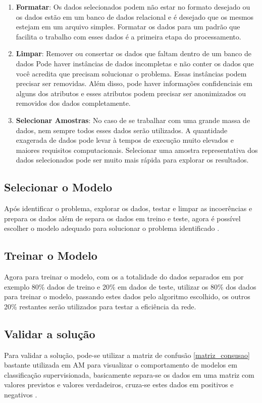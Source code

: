 \begin{enumerate}
	\item \textbf{Formatar}: Os dados selecionados podem não estar no formato desejado ou os dados estão em um banco de dados relacional e é desejado que os mesmos estejam em um arquivo simples. Formatar os dados para um padrão que facilita o trabalho com esses dados é a primeira etapa do processamento.
	\item \textbf{Limpar}: Remover ou consertar os dados que faltam dentro de um banco de dados  Pode haver instâncias de dados incompletas e não conter os dados que você acredita que precisam solucionar o problema. Essas instâncias podem precisar ser removidas. Além disso, pode haver informações confidenciais em alguns dos atributos e esses atributos podem precisar ser anonimizados ou removidos dos dados completamente.
	\item \textbf{Selecionar Amostras}: No caso de se trabalhar com uma grande massa de dados, nem sempre todos esses dados serão utilizados. A quantidade exagerada de dados pode levar à tempos de execução muito elevados e maiores requisitos computacionais. Selecionar uma amostra representativa dos dados selecionados pode ser muito mais rápida para explorar os resultados.
\end{enumerate}

\subsection{Selecionar o Modelo}
Após identificar o problema, explorar os dados, testar e limpar as incoerências e prepara os dados além de separa os dados em treino e teste, agora é possível escolher o modelo adequado para solucionar o problema identificado \cite{geron2017hands}.

\subsection{Treinar o Modelo}
Agora para treinar o modelo, com os a totalidade do dados separados em por exemplo 80\% dados de treino e 20\% em dados de teste, utilizar os 80\% dos dados para treinar o modelo, passando estes dados pelo algoritmo escolhido, os outros 20\% restantes serão utilizados para testar a eficiência da rede.

\subsection{Validar a solução}
Para validar a solução, pode-se utilizar a matriz de confusão \ref{matriz_consusao} bastante utilizada em AM para visualizar o comportamento de modelos em classificação supervisionada, basicamente separa-se os dados em uma matriz com valores previstos e valores verdadeiros, cruza-se estes dados em positivos e negativos \cite{caelen2017bayesian}.

